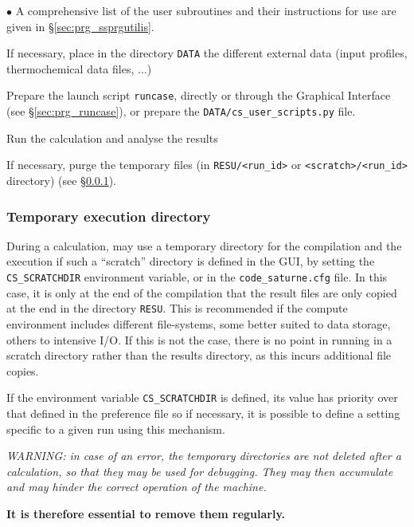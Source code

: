 {{{{{\begin{list}{$\bullet$}{}
A comprehensive list of the user subroutines and their instructions
      for use are given in \S\ref{sec:prg_ssprgutilis}.

\item If necessary, place in the directory \texttt{DATA} the different
      external data (input profiles, thermochemical data files, ...)

\item Prepare the launch script \texttt{runcase}, directly or through the
      Graphical Interface (see \S\ref{sec:prg_runcase}), or prepare the
      \texttt{DATA/cs\_user\_scripts.py} file.

\item Run the calculation and analyse the results

\item If necessary, purge the temporary files (in \texttt{RESU/<run\_id>} or
      \texttt{<scratch>/<run\_id>} directory) (see \S\ref{sec:prg_temporarydirectory}).
\end{list}


\subsubsection{Temporary execution directory}
\label{sec:prg_temporarydirectory}%
During a calculation, \CS may use a temporary directory for the compilation and
the execution if such a ``scratch'' directory is defined in the GUI, by setting the
\texttt{CS\_SCRATCHDIR} environment variable, or in the \texttt{code\_saturne.cfg} file.
In this case, it is only at the end of the compilation that the result files are only copied at the end in the directory
\texttt{RESU}. This is recommended if the compute environment includes different
file-systems, some better suited to data storage, others to intensive I/O.
If this is not the case, there is no point in running in a scratch directory
rather than the results directory, as this incurs additional file copies.

If the environment variable \texttt{CS\_SCRATCHDIR} is defined,
its value has priority over that defined in the preference file
so if necessary, it
is possible to define a setting specific to a given run using this mechanism.

\noindent
{\em WARNING: in case of an error, the temporary directories are not deleted
after a calculation, so that they may be used for debugging. They may then
accumulate and may hinder the correct operation of the machine.\\
\centerline{\bf It is therefore essential to remove them regularly.}}


}}}}}

